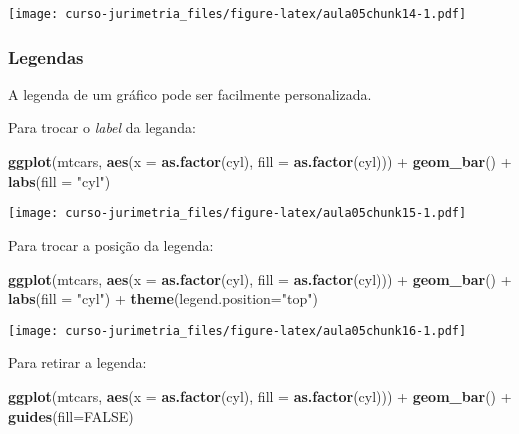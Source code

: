 \documentclass[]{book}
\newenvironment{Shaded}{\begin{snugshade}}{\end{snugshade}}
\newcommand{\KeywordTok}[1]{\textcolor[rgb]{0.13,0.29,0.53}{\textbf{{#1}}}}
\newcommand{\DataTypeTok}[1]{\textcolor[rgb]{0.13,0.29,0.53}{{#1}}}
\newcommand{\StringTok}[1]{\textcolor[rgb]{0.31,0.60,0.02}{{#1}}}
\newcommand{\OtherTok}[1]{\textcolor[rgb]{0.56,0.35,0.01}{{#1}}}
\newcommand{\NormalTok}[1]{{#1}}
\begin{document}
\texttt{[image: curso-jurimetria\_files/figure-latex/aula05chunk14-1.pdf]}

\subsubsection{Legendas}\label{legendas}

A legenda de um gráfico pode ser facilmente personalizada.

Para trocar o \emph{label} da leganda:

\begin{Shaded}
\begin{Highlighting}[]
\KeywordTok{ggplot}\NormalTok{(mtcars, }\KeywordTok{aes}\NormalTok{(}\DataTypeTok{x =} \KeywordTok{as.factor}\NormalTok{(cyl), }\DataTypeTok{fill =} \KeywordTok{as.factor}\NormalTok{(cyl))) +}\StringTok{ }
\StringTok{  }\KeywordTok{geom_bar}\NormalTok{() +}
\StringTok{  }\KeywordTok{labs}\NormalTok{(}\DataTypeTok{fill =} \StringTok{"cyl"}\NormalTok{)}
\end{Highlighting}
\end{Shaded}

\texttt{[image: curso-jurimetria\_files/figure-latex/aula05chunk15-1.pdf]}

Para trocar a posição da legenda:

\begin{Shaded}
\begin{Highlighting}[]
\KeywordTok{ggplot}\NormalTok{(mtcars, }\KeywordTok{aes}\NormalTok{(}\DataTypeTok{x =} \KeywordTok{as.factor}\NormalTok{(cyl), }\DataTypeTok{fill =} \KeywordTok{as.factor}\NormalTok{(cyl))) +}\StringTok{ }
\StringTok{  }\KeywordTok{geom_bar}\NormalTok{() +}
\StringTok{  }\KeywordTok{labs}\NormalTok{(}\DataTypeTok{fill =} \StringTok{"cyl"}\NormalTok{) +}
\StringTok{  }\KeywordTok{theme}\NormalTok{(}\DataTypeTok{legend.position=}\StringTok{"top"}\NormalTok{)}
\end{Highlighting}
\end{Shaded}

\texttt{[image: curso-jurimetria\_files/figure-latex/aula05chunk16-1.pdf]}

Para retirar a legenda:

\begin{Shaded}
\begin{Highlighting}[]
\KeywordTok{ggplot}\NormalTok{(mtcars, }\KeywordTok{aes}\NormalTok{(}\DataTypeTok{x =} \KeywordTok{as.factor}\NormalTok{(cyl), }\DataTypeTok{fill =} \KeywordTok{as.factor}\NormalTok{(cyl))) +}\StringTok{ }
\StringTok{  }\KeywordTok{geom_bar}\NormalTok{() +}
\StringTok{  }\KeywordTok{guides}\NormalTok{(}\DataTypeTok{fill=}\OtherTok{FALSE}\NormalTok{)}
\end{Highlighting}
\end{Shaded}
\end{document}
